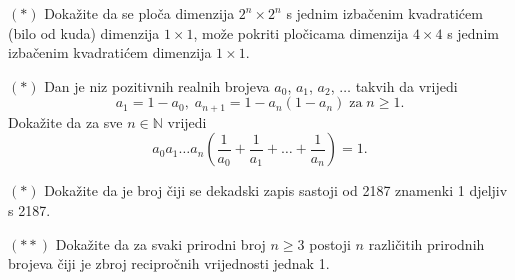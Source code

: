 \begin{exercise} $(*)$
Dokažite da se ploča dimenzija $2^n\times 2^n$ s jednim izbačenim kvadratićem (bilo od kuda) dimenzija $1\times 1$, može pokriti pločicama dimenzija $4\times 4$ s jednim izbačenim kvadratićem dimenzija $1\times 1$.
\end{exercise}
\begin{exercise} $(*)$
Dan je niz pozitivnih realnih brojeva $a_0$, $a_1$, $a_2$, $\dots$ takvih da vrijedi
$$a_1=1-a_0,\; a_{n+1}=1-a_n(1-a_n) \; \mathrm{za} \; n\geq 1.$$
Dokažite da za sve $n\in \mathbb{N}$ vrijedi
$$a_0a_1\dots a_n\left(\dfrac{1}{a_0}+\dfrac{1}{a_1}+\dots+ \dfrac{1}{a_n}\right)=1.$$
\end{exercise}
\begin{exercise} $(*)$
Dokažite da je broj čiji se dekadski zapis sastoji od 2187 znamenki 1 djeljiv s 2187.
\end{exercise}
\begin{exercise} $(**)$
Dokažite da za svaki prirodni broj $n\geq 3$ postoji $n$ različitih prirodnih brojeva čiji je zbroj recipročnih vrijednosti jednak 1.
\end{exercise}

